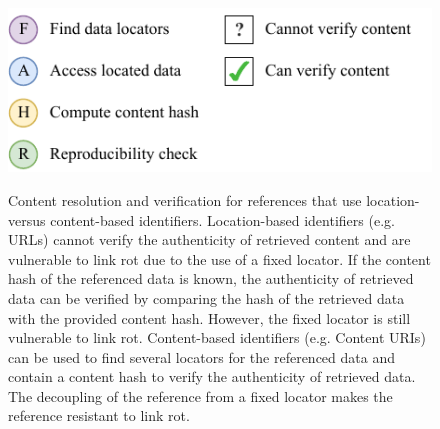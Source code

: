 \begin{figure}[!p] %


\centering
{} \\
 \\
 \\
\includegraphics[scale=.9]{figures/fig4legend.pdf}%

\caption{Content resolution and verification for references that use location- versus content-based identifiers.  Location-based identifiers (e.g. URLs) cannot verify the authenticity of retrieved content and are vulnerable to link rot due to the use of a fixed locator.  If the content hash of the referenced data is known, the authenticity of retrieved data can be verified by comparing the hash of the retrieved data with the provided content hash. However, the fixed locator is still vulnerable to link rot.  Content-based identifiers (e.g. Content URIs) can be used to find several locators for the referenced data and contain a content hash to verify the authenticity of retrieved data. The decoupling of the reference from a fixed locator makes the reference resistant to link rot.
}%

\label{fig:verification} %

\end{figure}
